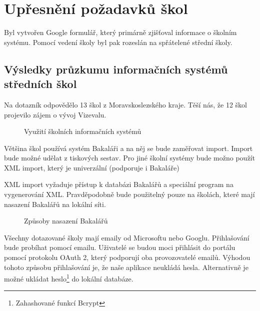 \section{Upřesnění požadavků škol}
Byl vytvořen Google formulář, který primárně zjišťoval informace o školním systému. Pomocí vedení školy byl pak rozeslán na spřátelené střední školy. 
\subsection{Výsledky průzkumu informačních systémů středních škol}
Na dotazník odpovědělo 13 škol z Moravskoslezského kraje. Těší nás, že 12 škol projevilo zájem o vývoj Vizevalu.

\begin{figure}[H]
    \centering
    \caption{Využití školních informačních systémů}
    \label{fig:vyuziti-skolnich-systemu}
\end{figure}

Většina škol používá systém Bakaláři a na něj se bude zaměřovat import. Import bude možné udělat z tiskových sestav. Pro jiné školní systémy bude možno použít XML import, který je univerzální (podporuje i Bakaláře)




XML import vyžaduje přístup k databázi Bakalářů a speciální program na vygenerování XML. Pravděpodobně bude použitelný pouze na školách, které mají nasazení Bakalářů na lokální síti. 

\begin{figure}[H]
    \centering

    \caption{Způsoby nasazení Bakalářů}
    \label{fig:poskytovatele-emailu}
\end{figure}

Všechny dotazované školy mají emaily od Microsoftu nebo Googlu.
Přihlašování bude probíhat pomocí emailu.
Uživatelé se budou moci přihlásit do portálu pomocí protokolu OAuth 2, který podporují oba provozovatelé emailů.
Výhodou tohoto způsobu přihlašování je, že naše aplikace neukládá hesla.
Alternativně je možné ukládat heslo\footnote{Zahashované funkcí Bcrypt} do lokální databáze.



